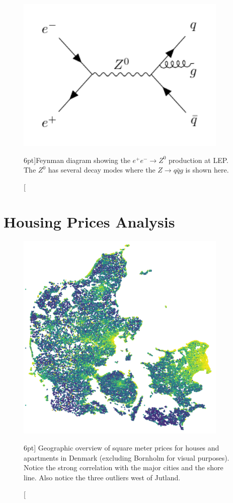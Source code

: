 \documentclass[a4paper, twoside, nobib]{tufte-book}
\begin{document}
\begin{figure}
  \includegraphics[width=0.9\textwidth]{figures/feynman_diagrams/eeZqqg.pdf}
  \caption[Feynman diagram for the jet production at LEP][6pt]{Feynman diagram showing the $e^+ e^- \rightarrow Z^0$ production at LEP. The $Z^0$ has several decay modes where the $Z \rightarrow q\bar{q}g$ is shown here.}
  \label{fig:feynman_3j_qqg}
\end{figure}


\chapter{Housing Prices Analysis}
\label{ch:housing_price_analysis}

\begin{figure}
  \includegraphics[width=0.9\textwidth, trim=0 0 0 0, clip]{figures/housing/Denmark_Overview_SqmPrice.png}
  \caption[Geographic overview of square meter price in Denmark][6pt]
          {Geographic overview of square meter prices for houses and apartments in Denmark (excluding Bornholm for visual purposes). Notice the strong correlation with the major cities and the shore line. Also notice the three outliers west of Jutland. }
  \label{fig:h:geo_overview}
\end{figure}
\end{document}
